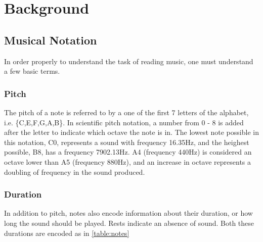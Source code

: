 \section{Background}
    \subsection{Musical Notation}
        In order properly to understand the task of reading music, one must understand a few basic terms.

        \subsubsection{Pitch}
            The pitch of a note is referred to by a one of the first 7 letters of the alphabet, i.e. \{C,E,F,G,A,B\}.
            In scientific pitch notation, a number from 0 - 8 is added after the letter to indicate which octave the note is in.
            The lowest note possible in this notation, C0, represents a sound with frequency 16.35Hz, and the heighest possible, B8, has a frequency 7902.13Hz.
            A4 (frequency 440Hz) is considered an octave lower than A5 (frequency 880Hz), and an increase in octave represents a doubling of frequency in the sound produced.
        \subsubsection{Duration}
            In addition to pitch, notes also encode information about their duration, or how long the sound should be played. 
            Rests indicate an absence of sound. Both these durations are encoded as in \ref{table:notes}

